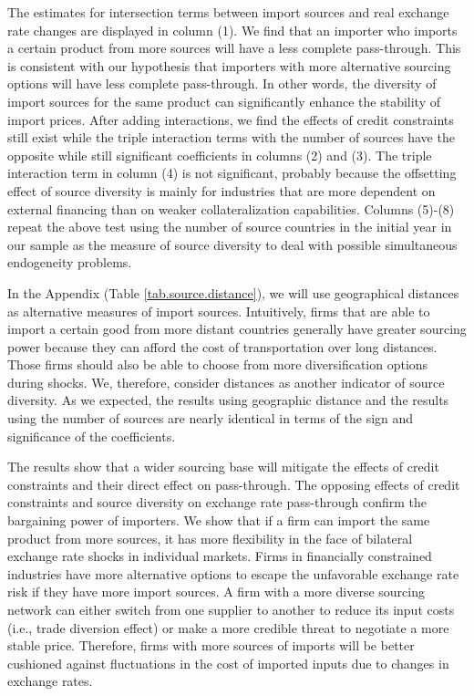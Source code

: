 The estimates for intersection terms between import sources and real exchange rate changes are displayed in column (1). We find that an importer who imports a certain product from more sources will have a less complete pass-through. This is consistent with our hypothesis that importers with more alternative sourcing options will have less complete pass-through. In other words, the diversity of import sources for the same product can significantly enhance the stability of import prices. After adding interactions, we find the effects of credit constraints still exist while the triple interaction terms with the number of sources have the opposite while still significant coefficients in columns (2) and (3). The triple interaction term in column (4) is not significant, probably because the offsetting effect of source diversity is mainly for industries that are more dependent on external financing than on weaker collateralization capabilities. Columns (5)-(8) repeat the above test using the number of source countries in the initial year in our sample as the measure of source diversity to deal with possible simultaneous endogeneity problems. 

In the Appendix (Table \ref{tab.source.distance}), we will use geographical distances  as alternative measures of import sources. Intuitively, firms that are able to import a certain good from more distant countries generally have greater sourcing power because they can afford the cost of transportation over long distances. Those firms should also be able to choose from more diversification options during shocks. We, therefore, consider distances as another indicator of source diversity. As we expected, the results using geographic distance and the results using the number of sources are nearly identical in terms of the sign and significance of the coefficients.

The results show that a wider sourcing base will mitigate the effects of credit constraints and their direct effect on pass-through. The opposing effects of credit constraints and source diversity on exchange rate pass-through confirm the bargaining power of importers. We show that if a firm can import the same product from more sources, it has more flexibility in the face of bilateral exchange rate shocks in individual markets. Firms in financially constrained industries have more alternative options to escape the unfavorable exchange rate risk if they have more import sources. A firm with a more diverse sourcing network can either switch from one supplier to another to reduce its input costs (i.e., trade diversion effect) or make a more credible threat to negotiate a more stable price. Therefore, firms with more sources of imports will be better cushioned against fluctuations in the cost of imported inputs due to changes in exchange rates.


